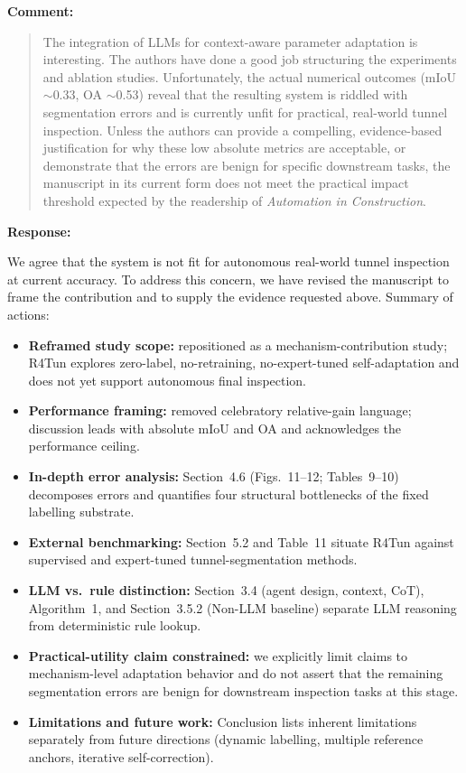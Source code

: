 \documentclass[11pt,a4paper]{article}
\newenvironment{commentblock}{%
  \par\smallskip\noindent\textbf{Comment:}\par
  \begin{quote}\itshape\color{black}
}{%
  \end{quote}\smallskip
}
\newenvironment{responseblock}{%
  \par\smallskip\noindent\textbf{Response:}\par
  \begingroup\color{responsegreen}
}{%
  \endgroup\smallskip
}
\begin{document}
\begin{commentblock}
The integration of LLMs for context-aware parameter adaptation is interesting. The authors have done a good job structuring the experiments and ablation studies. Unfortunately, the actual numerical outcomes (mIoU $\sim$0.33, OA $\sim$0.53) reveal that the resulting system is riddled with segmentation errors and is currently unfit for practical, real-world tunnel inspection. Unless the authors can provide a compelling, evidence-based justification for why these low absolute metrics are acceptable, or demonstrate that the errors are benign for specific downstream tasks, the manuscript in its current form does not meet the practical impact threshold expected by the readership of \emph{Automation in Construction}.
\end{commentblock}
\begin{responseblock}
We agree that the system is not fit for autonomous real-world tunnel inspection at current accuracy. To address this concern, we have revised the manuscript to frame the contribution and to supply the evidence requested above. Summary of actions:
\begin{itemize}[nosep]
  \item \textbf{Reframed study scope:} repositioned as a mechanism-contribution study; R4Tun explores zero-label, no-retraining, no-expert-tuned self-adaptation and does not yet support autonomous final inspection.
  \item \textbf{Performance framing:} removed celebratory relative-gain language; discussion leads with absolute mIoU and OA and acknowledges the performance ceiling.
  \item \textbf{In-depth error analysis:} Section~4.6 (Figs.~11--12; Tables~9--10) decomposes errors and quantifies four structural bottlenecks of the fixed labelling substrate.
  \item \textbf{External benchmarking:} Section~5.2 and Table~11 situate R4Tun against supervised and expert-tuned tunnel-segmentation methods.
  \item \textbf{LLM vs.\ rule distinction:} Section~3.4 (agent design, context, CoT), Algorithm~1, and Section~3.5.2 (Non-LLM baseline) separate LLM reasoning from deterministic rule lookup.
  \item \textbf{Practical-utility claim constrained:} we explicitly limit claims to mechanism-level adaptation behavior and do not assert that the remaining segmentation errors are benign for downstream inspection tasks at this stage.
  \item \textbf{Limitations and future work:} Conclusion lists inherent limitations separately from future directions (dynamic labelling, multiple reference anchors, iterative self-correction).
\end{itemize}
\end{responseblock}
\end{document}
